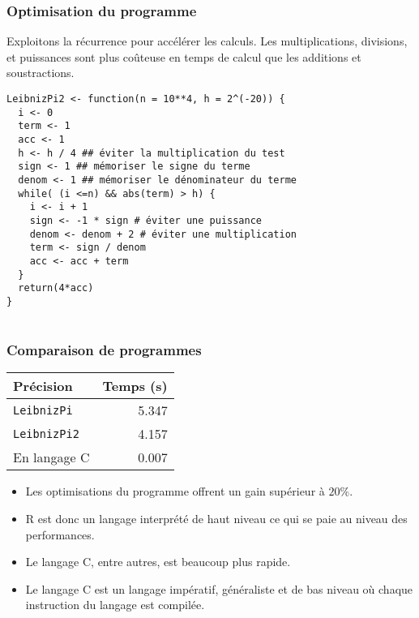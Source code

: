 \documentclass[10pt]{beamer}
\begin{document}
\begin{frame}[fragile]
  \frametitle{Optimisation du programme}
  \begin{alertblock}{Exploitons la récurrence pour accélérer les calculs.}
    \alert{Les multiplications, divisions, et puissances sont plus coûteuse en temps de calcul que les additions et soustractions.}
  \end{alertblock}

  \begin{lstlisting}
LeibnizPi2 <- function(n = 10**4, h = 2^(-20)) {
  i <- 0
  term <- 1
  acc <- 1
  h <- h / 4 ## éviter la multiplication du test
  sign <- 1 ## mémoriser le signe du terme 
  denom <- 1 ## mémoriser le dénominateur du terme
  while( (i <=n) && abs(term) > h) {
    i <- i + 1
    sign <- -1 * sign # éviter une puissance
    denom <- denom + 2 # éviter une multiplication
    term <- sign / denom
    acc <- acc + term
  }
  return(4*acc)
}
    
  \end{lstlisting}
\end{frame}

\begin{frame}
  \frametitle{Comparaison de programmes}

  
    \begin{table}[h]
    \centering
    \begin{tabular}{lr}
      \toprule
      Précision           & Temps (s) \\
      \midrule
      \texttt{LeibnizPi}  & 5.347     \\
      \texttt{LeibnizPi2} & 4.157     \\
      En langage C        & 0.007     \\
             \bottomrule
    \end{tabular}
  \end{table}

  \begin{itemize}
  \item Les optimisations du programme offrent un gain supérieur à $20\%$.
  \item R est donc un langage interprété de haut niveau ce qui se paie au niveau des performances.
  \item Le langage C, entre autres, est beaucoup plus rapide.
  \item Le langage C est un langage impératif, généraliste et de bas niveau où chaque instruction du langage est compilée.
  \end{itemize}

\end{frame}
\end{document}
